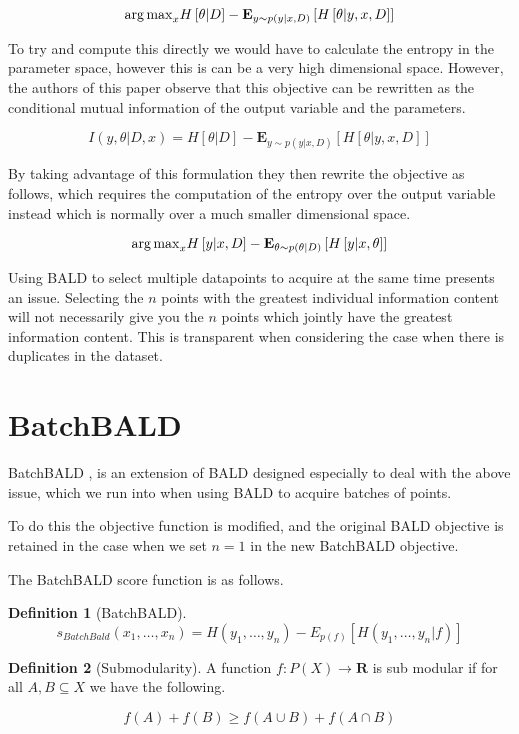 \documentclass[12pt, a4paper]{report}
\theoremstyle{definition}
\theoremstyle{definition}
\newtheorem{definition}{Definition}[section]
\theoremstyle{definition}
\begin{document}
$${\operatorname*{arg\,max}}_x H \left[ \theta | D \right] - \mathbf{E}_{y \sim p(y | x, D)} \left[ H\left[ \theta | y, x, D\right]\right]$$

To try and compute this directly we would have to calculate the entropy in the parameter space, however this is can be a very high dimensional space. However, the authors of this paper observe that this objective can be rewritten as the conditional mutual information of the output variable and the parameters.

$$I \left(y, \theta| D, x \right) = H \left[ \theta | D \right] - \mathbf{E}_{y \sim p(y | x, D)} \left[ H\left[ \theta | y, x, D\right]\right]$$


By taking advantage of this formulation they then rewrite the objective as follows, which requires the computation of the entropy over the output variable instead which is normally over a much smaller dimensional space.


$${\operatorname*{arg\,max}}_x H \left[ y | x, D \right] - \mathbf{E}_{\theta \sim p(\theta | D)} \left[ H\left[ y | x, \theta \right]\right]$$


Using BALD to select multiple datapoints to acquire at the same time presents an issue. Selecting the $n$ points with the greatest individual information content will not necessarily give you the $n$ points which jointly have the greatest information content. This is transparent when considering the case when there is duplicates in the dataset.

\section{BatchBALD}
BatchBALD \cite{kirsch2019batchbald}, is an extension of BALD designed especially to deal with the above issue, which we run into when using BALD to acquire batches of points.

To do this the objective function is modified, and the original BALD objective is retained in the case when we set $n = 1$ in the new BatchBALD objective.

The BatchBALD score function is as follows.

\begin{definition}[BatchBALD]
    $$s_{BatchBald} (x_1, \ldots, x_n) = H(y_1, \ldots, y_n) - E_{p(f)}\left[H(y_1, \ldots, y_n | f)\right]$$
\end{definition}


\begin{definition}[Submodularity]
    A function $f : P(X) \rightarrow \mathbf{R}$ is sub modular if for all $A,B \subseteq X$ we have the following.

    $$f(A) + f(B) \geq f\left( A \cup B \right) +  f\left(A \cap B \right) $$
\end{definition}
\end{document}
